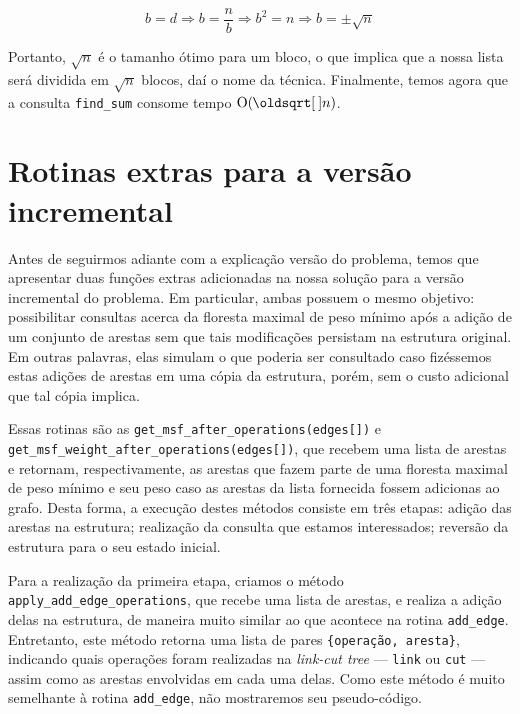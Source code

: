 \begin{equation}
    b = d \Rightarrow
    b = \frac{n}{b} \Rightarrow
    b^2 = n \Rightarrow
    b = \pm \sqrt{n}
\end{equation}

Portanto, $\sqrt{n}$ é o tamanho ótimo para um bloco, o que implica que a nossa lista será dividida em $\sqrt{n}$ blocos, daí o nome da técnica. Finalmente, temos agora que a consulta \texttt{find\_sum} consome tempo $\Oh(\sqrt{n})$.

\section{Rotinas extras para a versão incremental}
\label{sec:rmsf-extras}

Antes de seguirmos adiante com a explicação versão do problema, temos que apresentar duas funções extras adicionadas na nossa solução para a versão incremental do problema. Em particular, ambas possuem o mesmo objetivo: possibilitar consultas acerca da floresta maximal de peso mínimo após a adição de um conjunto de arestas sem que tais modificações persistam na estrutura original. Em outras palavras, elas simulam o que poderia ser consultado caso fizéssemos estas adições de arestas em uma cópia da estrutura, porém, sem o custo adicional que tal cópia implica.

Essas rotinas são as \texttt{get\_msf\_after\_operations(edges[])} e \texttt{get\_msf\_weight\_after\_operations(edges[])}, que recebem uma lista de arestas e retornam, respectivamente, as arestas que fazem parte de uma floresta maximal de peso mínimo e seu peso caso as arestas da lista fornecida fossem adicionas ao grafo. Desta forma, a execução destes métodos consiste em três etapas: adição das arestas na estrutura; realização da consulta que estamos interessados; reversão da estrutura para o seu estado inicial.

Para a realização da primeira etapa, criamos o método \texttt{apply\_add\_edge\_operations}, que recebe uma lista de arestas, e realiza a adição delas na estrutura, de maneira muito similar ao que acontece na rotina \texttt{add\_edge}. Entretanto, este método retorna uma lista de pares \texttt{\{operação, aresta\}}, indicando quais operações foram realizadas na \emph{link-cut tree} --- \texttt{link} ou \texttt{cut} --- assim como as arestas envolvidas em cada uma delas. Como este método é muito semelhante à rotina \texttt{add\_edge}, não mostraremos seu pseudo-código.

